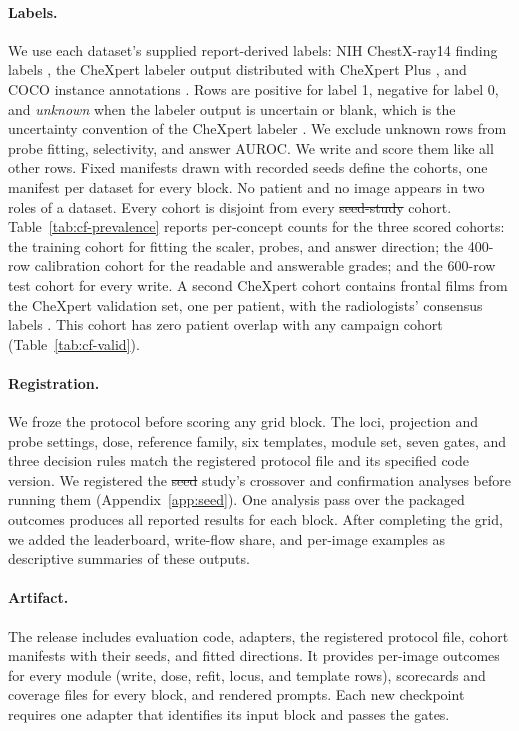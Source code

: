 \documentclass{article}
\makeatletter
\providecommand{\DIFaddtex}[1]{{\protect\color{blue}\uwave{#1}}} %
\providecommand{\DIFdeltex}[1]{{\protect\color{red}\sout{#1}}} %
\providecommand{\DIFaddbegin}{} %
\providecommand{\DIFaddend}{} %
\providecommand{\DIFdelbegin}{} %
\providecommand{\DIFdelend}{} %
\providecommand{\DIFadd}[1]{\texorpdfstring{\DIFaddtex{#1}}{#1}} %
\providecommand{\DIFdel}[1]{\texorpdfstring{\DIFdeltex{#1}}{}} %
\providecommand{\DIFscaledelfig}{0.5}
\newlength{\DIFdelgraphicswidth} %
\newlength{\DIFdelgraphicsheight} %
\providecommand{\DIFaddincludegraphics}[2][]{{\color{blue}\fbox{\DIFOincludegraphics[#1]{#2}}}} %
\providecommand{\DIFdelincludegraphics}[2][]{%
\sbox{\DIFdelgraphicsbox}{\DIFOincludegraphics[#1]{#2}}%
\settoboxwidth{\DIFdelgraphicswidth}{\DIFdelgraphicsbox} %
\settoboxtotalheight{\DIFdelgraphicsheight}{\DIFdelgraphicsbox} %
\scalebox{\DIFscaledelfig}{%
\parbox[b]{\DIFdelgraphicswidth}{\usebox{\DIFdelgraphicsbox}\\[-\baselineskip] \rule{\DIFdelgraphicswidth}{0em}}\llap{\resizebox{\DIFdelgraphicswidth}{\DIFdelgraphicsheight}{%
\setlength{\unitlength}{\DIFdelgraphicswidth}%
\begin{picture}(1,1)%
\thicklines\linethickness{2pt} %
{\color[rgb]{1,0,0}\put(0,0){\framebox(1,1){}}}%
{\color[rgb]{1,0,0}\put(0,0){\line( 1,1){1}}}%
{\color[rgb]{1,0,0}\put(0,1){\line(1,-1){1}}}%
\end{picture}%
}\hspace*{3pt}}} %
} %
\DeclareRobustCommand{\DIFaddbegin}{\DIFOaddbegin \let\includegraphics\DIFaddincludegraphics} %
\DeclareRobustCommand{\DIFaddend}{\DIFOaddend \let\includegraphics\DIFOincludegraphics} %
\DeclareRobustCommand{\DIFdelbegin}{\DIFOdelbegin \let\includegraphics\DIFdelincludegraphics} %
\DeclareRobustCommand{\DIFdelend}{\DIFOaddend \let\includegraphics\DIFOincludegraphics} %
\let\sout@orig\sout %
\renewcommand{\sout}[1]{\ifmmode\text{\sout@orig{\ensuremath{#1}}}\else\sout@orig{#1}\fi} %
\makeatother
\begin{document}
\DIFaddend \paragraph{Labels.} We use each dataset's supplied report-derived labels: NIH ChestX-ray14 finding labels \citep{wang2017chestxray}, the CheXpert labeler output \citep{irvin2019chexpert} distributed with CheXpert Plus \citep{chambon2024chexpertplus}, and COCO instance annotations \citep{lin2014coco}. Rows are positive for label 1, negative for label 0, and \emph{unknown} when the labeler output is uncertain or blank, which is the uncertainty convention of the CheXpert labeler \citep{irvin2019chexpert}. We exclude unknown rows from probe fitting, selectivity, and answer AUROC. We write and score them like all other rows. Fixed manifests drawn with recorded seeds define the cohorts, one manifest per dataset for every block. No patient and no image appears in two roles of a dataset. Every cohort is disjoint from every \DIFdelbegin \DIFdel{seed-study }\DIFdelend \DIFaddbegin \DIFadd{pilot-study }\DIFaddend cohort. Table~\ref{tab:cf-prevalence} reports per-concept counts for the three scored cohorts: the training cohort for fitting the scaler, probes, and answer direction; the 400-row calibration cohort for the readable and answerable grades; and the 600-row test cohort for every write. A second CheXpert cohort contains \cfValidRows{} frontal films from the CheXpert validation set, one per patient, with the radiologists' consensus labels \citep{irvin2019chexpert}. This cohort has zero patient overlap with any campaign cohort (Table~\ref{tab:cf-valid}).

\paragraph{Registration.} We froze the protocol before scoring any grid block. The loci, projection and probe settings, dose, reference family, six templates, module set, seven gates, and three decision rules match the registered protocol file and its specified code version. We registered the \DIFdelbegin \DIFdel{seed }\DIFdelend \DIFaddbegin \DIFadd{pilot }\DIFaddend study's crossover and confirmation analyses before running them (Appendix~\ref{app:seed}). One analysis pass over the packaged outcomes produces all reported results for each block. After completing the grid, we added the leaderboard, write-flow share, and per-image examples as descriptive summaries of these outputs.

\paragraph{Artifact.} The release includes evaluation code, adapters, the registered protocol file, cohort manifests with their seeds, and fitted directions. It provides per-image outcomes for every module (write, dose, refit, locus, and template rows), scorecards and coverage files for every block, and rendered prompts. Each new checkpoint requires one adapter that identifies its input block and passes the gates.
\end{document}
